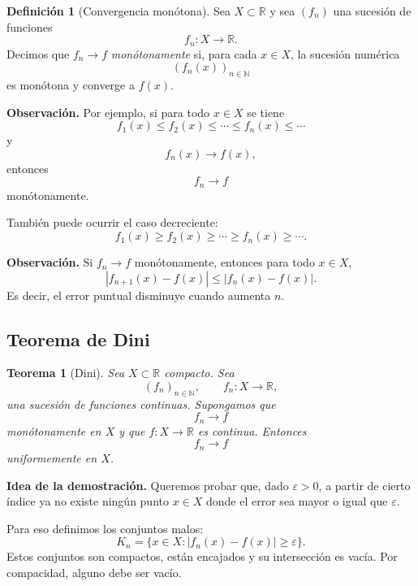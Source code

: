 \documentclass[11pt,a4paper,openany]{book}
\theoremstyle{definition}
\newtheorem{definicion}{Definición}[chapter]
\theoremstyle{plain}
\newtheorem{teorema}{Teorema}[chapter]
\theoremstyle{remark}
\newenvironment{observacion}
{\par\medskip\noindent\textbf{Observación. }\normalfont}
{\par\medskip}
\newenvironment{idea}
{\begin{comentariolibro}\textbf{Idea de la demostración. }\normalfont}
{\end{comentariolibro}}
\newcommand{\R}{\mathbb{R}}
\newcommand{\N}{\mathbb{N}}
\begin{document}
\begin{grisplano}
\begin{definicion}[Convergencia monótona]
Sea $X\subset\R$ y sea $(f_n)$ una sucesión de funciones
\[
    f_n:X\to\R.
\]
Decimos que $f_n\to f$ \emph{monótonamente} si, para cada $x\in X$, la sucesión
numérica
\[
    (f_n(x))_{n\in\N}
\]
es monótona y converge a $f(x)$.
\end{definicion}
\end{grisplano}

\begin{observacion}
Por ejemplo, si para todo $x\in X$ se tiene
\[
    f_1(x)\leq f_2(x)\leq \cdots \leq f_n(x)\leq \cdots
\]
y
\[
    f_n(x)\to f(x),
\]
entonces
\[
    f_n\to f
\]
monótonamente.

También puede ocurrir el caso decreciente:
\[
    f_1(x)\geq f_2(x)\geq \cdots \geq f_n(x)\geq \cdots.
\]
\end{observacion}

\begin{observacion}
Si $f_n\to f$ monótonamente, entonces para todo $x\in X$,
\[
    |f_{n+1}(x)-f(x)|
    \leq
    |f_n(x)-f(x)|.
\]
Es decir, el error puntual disminuye cuando aumenta $n$.
\end{observacion}

\subsection{Teorema de Dini}

\begin{grisplano}
\begin{teorema}[Dini]
Sea $X\subset\R$ compacto. Sea
\[
    (f_n)_{n\in\N},\qquad f_n:X\to\R,
\]
una sucesión de funciones continuas. Supongamos que
\[
    f_n\to f
\]
monótonamente en $X$ y que $f:X\to\R$ es continua. Entonces
\[
    f_n\to f
\]
uniformemente en $X$.
\end{teorema}
\end{grisplano}

\begin{idea}
Queremos probar que, dado $\varepsilon>0$, a partir de cierto índice ya no
existe ningún punto $x\in X$ donde el error sea mayor o igual que
$\varepsilon$.

Para eso definimos los conjuntos malos:
\[
    K_n=\{x\in X:|f_n(x)-f(x)|\geq \varepsilon\}.
\]
Estos conjuntos son compactos, están encajados y su intersección es vacía.
Por compacidad, alguno debe ser vacío.
\end{idea}
\end{document}
